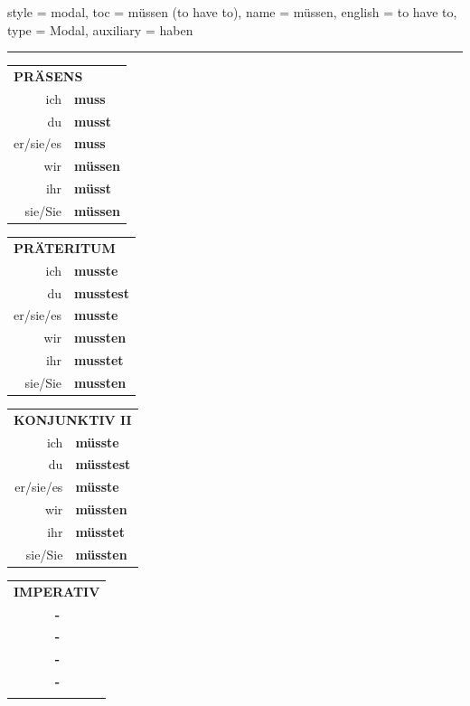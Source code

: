 \begin{verbentry}{
  style = {modal},
  toc = {müssen (to have to)},
  name = {müssen},
  english = {to have to},
  type = {Modal},
  auxiliary = {haben}
}
 
     \vspace{5pt}
    \hrule
    \vspace{5pt}
  \begin{tabular}{rl}
     \multicolumn{2}{l}{\textbf{PRÄSENS} }\\
    ich & \textbf{muss}\\
    du & \textbf{musst}\\
    er/sie/es & \textbf{muss}\\
    wir & \textbf{müssen}\\
    ihr & \textbf{müsst}\\
    sie/Sie & \textbf{müssen}\\
  \end{tabular}
  \hfill
     \begin{tabular}{rl}
    \multicolumn{2}{l}{\textbf{PRÄTERITUM} }\\
    ich & \textbf{musste}\\
    du & \textbf{musstest}\\
    er/sie/es & \textbf{musste}\\
    wir & \textbf{mussten}\\
    ihr & \textbf{musstet}\\
    sie/Sie & \textbf{mussten}\\
  \end{tabular}
   \hfill
     \begin{tabular}{rl}
    \multicolumn{2}{l}{\textbf{KONJUNKTIV II} }\\
    ich & \textbf{müsste}\\
    du & \textbf{müsstest}\\
    er/sie/es & \textbf{müsste}\\
    wir & \textbf{müssten}\\
    ihr & \textbf{müsstet}\\
    sie/Sie & \textbf{müssten}\\
  \end{tabular}
  \hfill
  \begin{tabular}{rl}
     \multicolumn{2}{l}{\textbf{IMPERATIV} }\\
   & \textbf{-}\\
   & \textbf{-}\\
   & \textbf{-}\\
   & \textbf{-}\\
   & \vspace{10pt}
  \end{tabular}


\end{verbentry}
